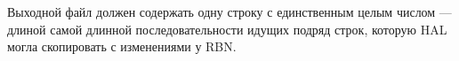 Выходной файл должен содержать одну строку с единственным целым числом --- 
длиной самой длинной последовательности идущих подряд строк, которую HAL 
могла скопировать с изменениями у RBN.